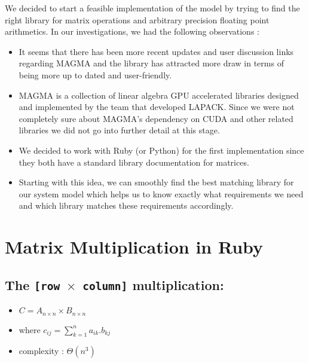 \documentclass[11pt, letterpaper, oneside]{article}
\begin{document}
	We decided to start a feasible implementation of the model by trying to find the right library
	for matrix operations and arbitrary precision floating point arithmetics. In our investigations,
	we had the following observations :
	
	\begin{itemize}
	 
	\item It seems that there has been more recent updates and user discussion links regarding MAGMA
	and the library has attracted more draw in terms of being more up to dated and user-friendly.
	\item MAGMA is a collection of linear algebra GPU accelerated libraries designed and implemented
	by the team that developed LAPACK. Since we were not completely sure about MAGMA's dependency on
	CUDA and other related libraries we did not go into further detail at this stage.
	\item We decided to work with Ruby (or Python) for the first implementation since they both have a
	standard library documentation for matrices.
	\item Starting with this idea, we can smoothly find the best matching library for our system 
	model which helps us to know exactly what requirements we need and which library matches these 
	requirements accordingly.
	\end{itemize}





\section{Matrix Multiplication in Ruby}


\subsection{The \texttt{[row $\times$ column]} multiplication:}
	\begin{itemize}
	\item $ C = A_{n \times n} \times B_{n \times n}$
	\item where $ c_{ij} = \sum\limits_{k=1}^n a_{ik} . b_{kj}   $
	\item complexity : $\Theta(n^3)$ \\
	\end{itemize}
\end{document}

